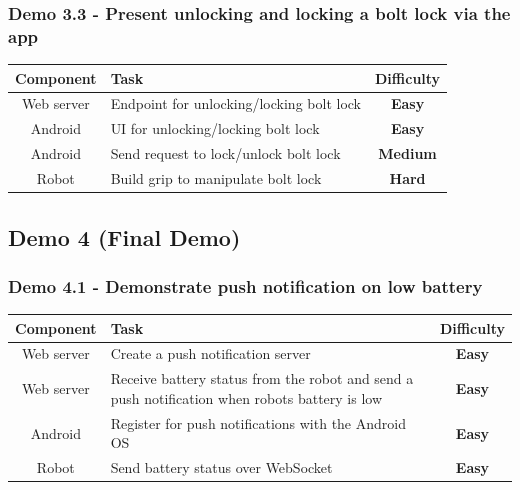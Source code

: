 \documentclass[onecolumn]{IEEEtran}
\newcommand{\easy}{{\color{green} \textbf{Easy}}}
\newcommand{\medium}{{\color{orange} \textbf{Medium}}}
\newcommand{\hard}{{\color{red} \textbf{Hard}}}
\begin{document}
\subsubsection{Demo 3.3 - Present unlocking and locking a bolt lock via the app}

\begin{center}
    \begin{tabularx}{0.8\linewidth}{|c|L|c|}
        \hline
        \textbf{Component} & \textbf{Task} & \textbf{Difficulty} \\
        \hline
        Web server & Endpoint for unlocking/locking bolt lock & \easy \\
        \hline
        Android & UI for unlocking/locking bolt lock & \easy \\
        \hline
        Android & Send request to lock/unlock bolt lock & \medium \\
        \hline
        Robot & Build grip to manipulate bolt lock & \hard \\
        \hline
    \end{tabularx}
\end{center}

\subsection{Demo 4 (Final Demo)}

\subsubsection{Demo 4.1 - Demonstrate push notification on low battery}

\begin{center}
    \begin{tabularx}{0.8\linewidth}{|c|L|c|}
        \hline
        \textbf{Component} & \textbf{Task} & \textbf{Difficulty} \\
        \hline
        Web server & Create a push notification server & \easy \\
        \hline
        Web server & Receive battery status from the robot and send a push notification when robots battery is low & \easy \\
        \hline
        Android & Register for push notifications with the Android OS & \easy \\
        \hline
        Robot & Send battery status over WebSocket & \easy \\
        \hline
    \end{tabularx}
\end{center}
\end{document}
